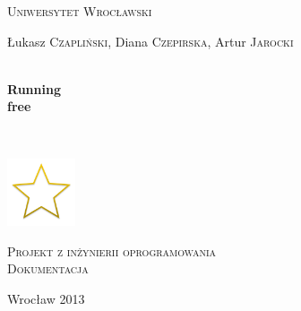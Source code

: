 \begin{titlepage}
  \begin{center}

    \textsc{\LARGE Uniwersytet Wrocławski}\\[1.5cm]


    \vspace{3cm}

    \begin{minipage}{\textwidth}
      \begin{center} \Large
        Łukasz \textsc{Czapliński},
        Diana \textsc{Czepirska},
        Artur \textsc{Jarocki}
      \end{center}
    \end{minipage}

    \vspace{0.5cm}



    \HRule \\[0.4cm]
    { \Huge \bfseries Running\\free  \\[0.4cm] }

    \HRule \\[1.5cm]


    \vspace{1cm}

    \includegraphics[width=0.15\textwidth]{./non-starred.png}~\\[1cm]
    
    \vfill
    
    \textsc{\Large Projekt z inżynierii oprogramowania\\Dokumentacja}\\[0.5cm]

    \vspace{1cm}

    {\large Wrocław 2013}

  \end{center}
\end{titlepage}
